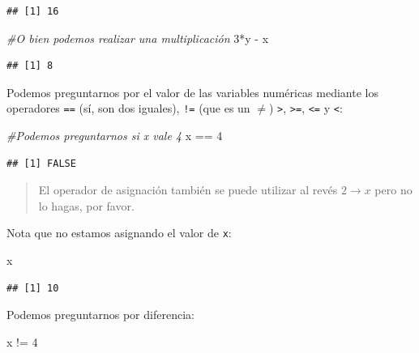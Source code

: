 \documentclass[
]{book}
\newenvironment{Shaded}{\begin{snugshade}}{\end{snugshade}}
\newcommand{\CommentTok}[1]{\textcolor[rgb]{0.56,0.35,0.01}{\textit{#1}}}
\newcommand{\DecValTok}[1]{\textcolor[rgb]{0.00,0.00,0.81}{#1}}
\newcommand{\NormalTok}[1]{#1}
\newcommand{\SpecialCharTok}[1]{\textcolor[rgb]{0.00,0.00,0.00}{#1}}
\begin{document}
\begin{verbatim}
## [1] 16
\end{verbatim}

\begin{Shaded}
\begin{Highlighting}[]
\CommentTok{\#O bien podemos realizar una multiplicación}
\DecValTok{3}\SpecialCharTok{*}\NormalTok{y }\SpecialCharTok{{-}}\NormalTok{ x}
\end{Highlighting}
\end{Shaded}

\begin{verbatim}
## [1] 8
\end{verbatim}

Podemos preguntarnos por el valor de las variables numéricas mediante los operadores \texttt{==} (sí, son dos iguales), \texttt{!=} (que es un \(\neq\)) \texttt{\textgreater{}}, \texttt{\textgreater{}=}, \texttt{\textless{}=} y \texttt{\textless{}}:

\begin{Shaded}
\begin{Highlighting}[]
\CommentTok{\#Podemos preguntarnos si x vale 4}
\NormalTok{x }\SpecialCharTok{==} \DecValTok{4}
\end{Highlighting}
\end{Shaded}

\begin{verbatim}
## [1] FALSE
\end{verbatim}

\begin{quote}
El operador de asignación también se puede utilizar al revés \(2 \rightarrow x\) pero no lo hagas, por favor.
\end{quote}

Nota que no estamos asignando el valor de \texttt{x}:

\begin{Shaded}
\begin{Highlighting}[]
\NormalTok{x}
\end{Highlighting}
\end{Shaded}

\begin{verbatim}
## [1] 10
\end{verbatim}

Podemos preguntarnos por diferencia:

\begin{Shaded}
\begin{Highlighting}[]
\NormalTok{x }\SpecialCharTok{!=} \DecValTok{4} 
\end{Highlighting}
\end{Shaded}
\end{document}
